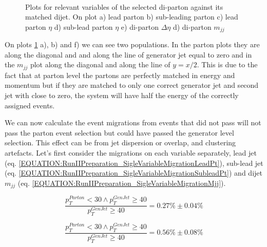 \begin{figure}[!htp]
\\
\caption[]{Plots for relevant variables of the selected di-parton against its matched dijet. On plot a) lead parton \pt b) sub-leading parton \pt c) lead parton $\eta$ d) sub-lead parton $\eta$ e) di-parton $\Delta\eta$ d) di-parton $m_{jj}$}
\label{FIGURE:RunIIPreparation_VariablesPartonVsGenJet}
\end{figure}

On plots \ref{FIGURE:RunIIPreparation_VariablesPartonVsGenJet} a), b) and f) we can see two populations. In the parton \pt plots they are along the diagonal and and along the line of generator jet \pt equal to zero and in the $m_{jj}$ plot along the diagonal and along the line of $y=x/2$.  This is due to the fact that at parton level the partons are perfectly matched in energy and momentum but if they are matched to only one correct generator jet and second jet with \pt close to zero, the system will have half the energy of the correctly assigned events.

We can now calculate the event migrations from events that did not pass will not pass the parton event selection but could have passed the generator level selection. This effect can be from jet dispersion or overlap, and clustering artefacts. Let's first consider the migrations on each variable separately, lead jet \pt (eq. \ref{EQUATION:RunIIPreparation_SigleVariableMigrationLeadPt}), sub-lead jet \pt (eq. \ref{EQUATION:RunIIPreparation_SigleVariableMigrationSubleadPt}) and dijet $m_{jj}$ (eq. \ref{EQUATION:RunIIPreparation_SigleVariableMigrationMjj}).

\small
\begin{equation}
\label{EQUATION:RunIIPreparation_SigleVariableMigrationLeadPt}
\frac{p_{T}^{Parton}<30 \wedge p_{T}^{GenJet} \geq 40}{p_{T}^{GenJet} \geq 40}=0.27\% \pm 0.04\%
\end{equation}

\begin{equation}
\label{EQUATION:RunIIPreparation_SigleVariableMigrationSubleadPt}
\frac{p_{T}^{Parton}<30 \wedge p_{T}^{GenJet} \geq 40}{p_{T}^{GenJet} \geq 40}=0.56\% \pm 0.08\%
\end{equation}

